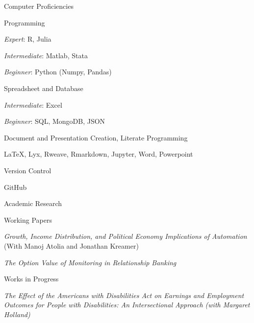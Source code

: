 \documentclass{resume} %
\begin{document}

\begin{rSection}{Computer Proficiencies}

\begin{rSubsection}{Programming}{}{}{}
    \item {\em Expert}: R, Julia
    \item {\em Intermediate}: Matlab, Stata 
    \item {\em Beginner}: Python (Numpy, Pandas)
\end{rSubsection}

\begin{rSubsection}{Spreadsheet and Database}{}{}{}
    \item {\em Intermediate}: Excel 
    \item {\em Beginner}: SQL, MongoDB, JSON
\end{rSubsection}

\begin{rSubsection}{Document and Presentation Creation, Literate Programming}{}{}{}
    \item \LaTeX, Lyx, Rweave, Rmarkdown, Jupyter, Word, Powerpoint
\end{rSubsection}

\newpage

\begin{rSubsection}{Version Control}{}{}{}
    \item GitHub
\end{rSubsection}

\end{rSection}

\begin{rSection}{Academic Research}

\begin{rSubsection}{Working Papers}{}{}{}
    \item {\em Growth, Income Distribution, and Political Economy Implications of Automation} (With Manoj Atolia and Jonathan Kreamer)
    \item {\em The Option Value of Monitoring in Relationship Banking}
\end{rSubsection}

\begin{rSubsection}{Works in Progress}{}{}{}
    \item {\em The Effect of the Americans with Disabilities Act on Earnings and Employment Outcomes for People with Disabilities: An Intersectional Approach (with Margaret Holland)}
\end{rSubsection}

\end{rSection}
\end{document}
